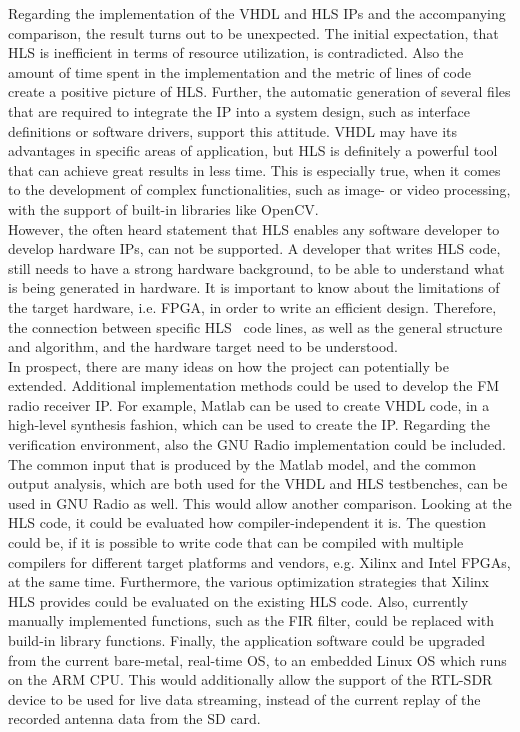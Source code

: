 Regarding the implementation of the VHDL and HLS IPs and the accompanying comparison, the result turns out to be unexpected.
The initial expectation, that HLS is inefficient in terms of resource utilization, is contradicted.
Also the amount of time spent in the implementation and the metric of lines of code create a positive picture of HLS.
Further, the automatic generation of several files that are required to integrate the IP into a system design, such as interface definitions or software drivers, support this attitude.
VHDL may have its advantages in specific areas of application, but HLS is definitely a powerful tool that can achieve great results in less time.
This is especially true, when it comes to the development of complex functionalities, such as image- or video processing, with the support of built-in libraries like OpenCV.\\

However, the often heard statement that HLS enables any software developer to develop hardware IPs, can not be supported.
A developer that writes HLS code, still needs to have a strong hardware background, to be able to understand what is being generated in hardware.
It is important to know about the limitations of the target hardware, i.e. FPGA, in order to write an efficient design.
Therefore, the connection between specific HLS \cplusplus\ code lines, as well as the general structure and algorithm, and the hardware target need to be understood.\\

In prospect, there are many ideas on how the project can potentially be extended.
Additional implementation methods could be used to develop the FM radio receiver IP.
For example, Matlab can be used to create VHDL code, in a high-level synthesis fashion, which can be used to create the IP.
Regarding the verification environment, also the GNU Radio implementation could be included.
The common input that is produced by the Matlab model, and the common output analysis, which are both used for the VHDL and HLS testbenches, can be used in GNU Radio as well.
This would allow another comparison.
Looking at the HLS code, it could be evaluated how compiler-independent it is.
The question could be, if it is possible to write code that can be compiled with multiple compilers for different target platforms and vendors, e.g. Xilinx and Intel FPGAs, at the same time.
Furthermore, the various optimization strategies that Xilinx HLS provides could be evaluated on the existing HLS code.
Also, currently manually implemented functions, such as the FIR filter, could be replaced with build-in library functions.
Finally, the application software could be upgraded from the current bare-metal, real-time OS, to an embedded Linux OS which runs on the ARM CPU.
This would additionally allow the support of the RTL-SDR device to be used for live data streaming, instead of the current replay of the recorded antenna data from the SD card.\\

